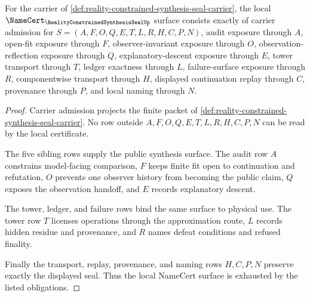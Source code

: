 \begin{theorem}
\label{thm:reality-constrained-synthesis-seal-namecert-obligations}
For the carrier of \autoref{def:reality-constrained-synthesis-seal-carrier}, the local $\NameCert_{\RealityConstrainedSynthesisSealUp}$ surface consists exactly of carrier admission for $S=(A,F,O,Q,E,T,L,R,H,C,P,N)$, audit exposure through $A$, open-fit exposure through $F$, observer-invariant exposure through $O$, observation-reflection exposure through $Q$, explanatory-descent exposure through $E$, tower transport through $T$, ledger exactness through $L$, failure-surface exposure through $R$, componentwise transport through $H$, displayed continuation replay through $C$, provenance through $P$, and local naming through $N$.
\end{theorem}
\begin{proof}
Carrier admission projects the finite packet of \autoref{def:reality-constrained-synthesis-seal-carrier}. No row outside $A,F,O,Q,E,T,L,R,H,C,P,N$ can be read by the local certificate.

The five sibling rows supply the public synthesis surface. The audit row $A$ constrains model-facing comparison, $F$ keeps finite fit open to continuation and refutation, $O$ prevents one observer history from becoming the public claim, $Q$ exposes the observation handoff, and $E$ records explanatory descent.

The tower, ledger, and failure rows bind the same surface to physical use. The tower row $T$ licenses operations through the approximation route, $L$ records hidden residue and provenance, and $R$ names defeat conditions and refused finality.

Finally the transport, replay, provenance, and naming rows $H,C,P,N$ preserve exactly the displayed seal. Thus the local NameCert surface is exhausted by the listed obligations.
\end{proof}

